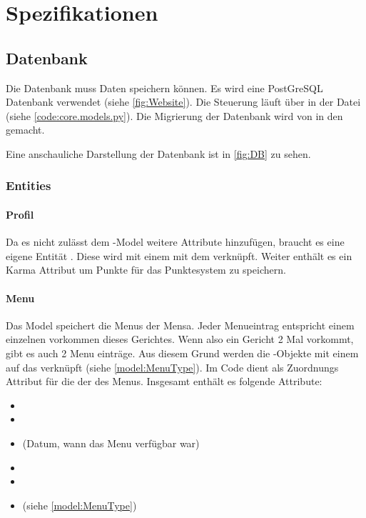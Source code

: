 \chapter{Spezifikationen}
\section{Datenbank}\label{spez:DB} Die Datenbank muss Daten speichern können. Es
wird eine PostGreSQL Datenbank verwendet (siehe \ref{fig:Website}). Die
Steuerung läuft über  in der  Datei (siehe
\ref{code:core.models.py}). Die Migrierung der Datenbank wird von 
in den  gemacht.

Eine anschauliche Darstellung der Datenbank ist in \ref{fig:DB} zu sehen.

\subsection{Entities}
\subsubsection{Profil}\label{model:Profil}
Da  es nicht zulässt dem -Model weitere Attribute
hinzufügen, braucht es eine eigene Entität . Diese wird mit einem
 mit dem  verknüpft. Weiter enthält es ein Karma
Attribut um Punkte für das Punktesystem zu speichern.

\subsubsection{Menu}\label{model:Menu} Das  Model speichert die Menus
der Mensa. Jeder Menueintrag entspricht einem einzelnen vorkommen dieses
Gerichtes. Wenn also ein Gericht 2 Mal vorkommt, gibt es auch 2 Menu einträge.
Aus diesem Grund werden die -Objekte mit einem  auf
das  verknüpft (siehe \ref{model:MenuType}). Im Code dient als
Zuordnungs Attribut für die  der  des Menus. Insgesamt enthält es
folgende Attribute:
\begin{itemize}
    \item {}
    \item {}
    \item {} (Datum, wann das Menu verfügbar war)
    \item {}
    \item {}
    \item {} (siehe \ref{model:MenuType})
\end{itemize}


